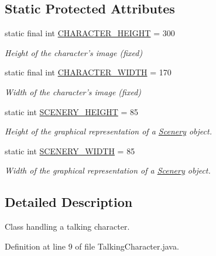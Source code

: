 \subsection*{Static Protected Attributes}
\begin{DoxyCompactItemize}
\item 
static final int \hyperlink{classworld_1_1character_1_1_character_a31596c03022d61aeb8aac56f149309be}{C\-H\-A\-R\-A\-C\-T\-E\-R\-\_\-\-H\-E\-I\-G\-H\-T} = 300
\begin{DoxyCompactList}\small\item\em Height of the character's image (fixed) \end{DoxyCompactList}\item 
static final int \hyperlink{classworld_1_1character_1_1_character_a2a46ba03b3e10896b7757f891336e8b8}{C\-H\-A\-R\-A\-C\-T\-E\-R\-\_\-\-W\-I\-D\-T\-H} = 170
\begin{DoxyCompactList}\small\item\em Width of the character's image (fixed) \end{DoxyCompactList}\item 
static int \hyperlink{classworld_1_1scenery_1_1_scenery_a106e53ae6e1647395740237ccce7f363}{S\-C\-E\-N\-E\-R\-Y\-\_\-\-H\-E\-I\-G\-H\-T} = 85
\begin{DoxyCompactList}\small\item\em Height of the graphical representation of a \hyperlink{classworld_1_1scenery_1_1_scenery}{Scenery} object. \end{DoxyCompactList}\item 
static int \hyperlink{classworld_1_1scenery_1_1_scenery_affb047c028883c6d069a03ef0f1caeb8}{S\-C\-E\-N\-E\-R\-Y\-\_\-\-W\-I\-D\-T\-H} = 85
\begin{DoxyCompactList}\small\item\em Width of the graphical representation of a \hyperlink{classworld_1_1scenery_1_1_scenery}{Scenery} object. \end{DoxyCompactList}\end{DoxyCompactItemize}


\subsection{Detailed Description}
Class handling a talking character. 

Definition at line 9 of file Talking\-Character.\-java.



